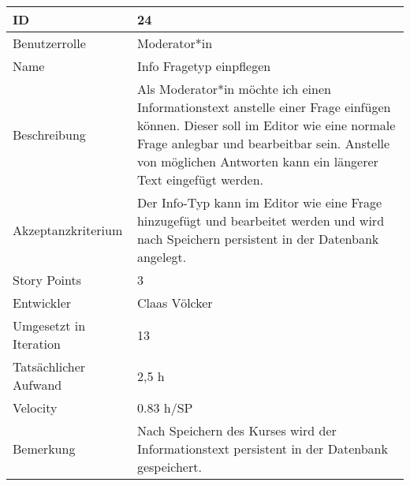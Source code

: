 \begin{tabularx}{\textwidth}{|p{}|X|}
	\hline
	ID & 24 \\
	\hline
	Benutzerrolle & Moderator*in \\
	\hline
	Name & Info Fragetyp einpflegen\\
	\hline
	Beschreibung & Als Moderator*in möchte ich einen Informationstext anstelle einer Frage einfügen können.
		Dieser soll im Editor wie eine normale Frage anlegbar und bearbeitbar sein.
		Anstelle von möglichen Antworten kann ein längerer Text eingefügt werden.\\
	\hline
	Akzeptanzkriterium & Der Info-Typ kann im Editor wie eine Frage hinzugefügt und bearbeitet werden und wird nach Speichern persistent in der Datenbank angelegt. \\
	\hline
	Story Points & 3 \\
	\hline
	Entwickler & Claas Völcker\\
	\hline
	Umgesetzt in Iteration & 13\\
	\hline
	Tatsächlicher Aufwand & 2,5 h\\
	\hline
	Velocity & 0.83 h/SP\\
	\hline
	Bemerkung & Nach Speichern des Kurses wird der Informationstext persistent in der Datenbank gespeichert.\\
	\hline
\end{tabularx}
\vspace{20pt}
